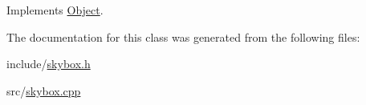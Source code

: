 Implements \hyperlink{classObject_a262654508b0a6a8cd277911161c71024}{Object}.



The documentation for this class was generated from the following files\+:\begin{DoxyCompactItemize}
\item 
include/\hyperlink{skybox_8h}{skybox.\+h}\item 
src/\hyperlink{skybox_8cpp}{skybox.\+cpp}\end{DoxyCompactItemize}

